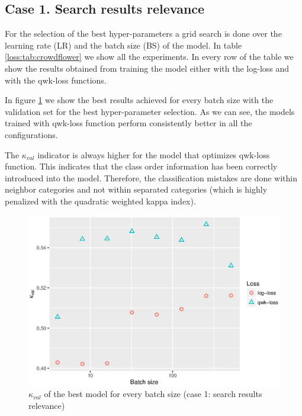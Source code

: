 \subsection{Case 1. Search results relevance}

For the selection of the best hyper-parameters a grid search is done over the learning rate (LR) and the batch size (BS) of the model. In table \ref{loss:tab:crowdflower} we show all the experiments. In every row of the table we show the results obtained from training the model either with the log-loss and with the qwk-loss functions.

In figure \ref{loss:fig:crowdflower} we show the best results achieved for every batch size with the validation set for the best hyper-parameter selection. As we can see, the models trained with qwk-loss function perform consistently better in all the configurations.

The $\kappa_{val}$ indicator is always higher for the model that optimizes qwk-loss function. This indicates that the class order information has been correctly introduced into the model. Therefore, the classification mistakes are done within neighbor categories and not within separated categories (which is highly penalized with the quadratic weighted kappa index).

\begin{figure}[!htb]
	\centering
	\includegraphics[width=\textwidth]{Figures/chapter_loss/crowdflower-results.eps}
	\caption[$QWK_{val}$ vs BS - Search results relevance use case]{$\kappa_{val}$ of the best model for every batch size  (case 1: search results relevance)}
	\label{loss:fig:crowdflower}
\end{figure}

